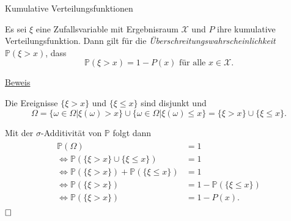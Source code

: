 \documentclass[
  8pt,
  ignorenonframetext,
]{beamer}
\begin{document}
\begin{frame}{Kumulative Verteilungsfunktionen}
\protect\hypertarget{kumulative-verteilungsfunktionen-1}{}
\small
\begin{theorem}[Überschreitungswahrscheinlichkeit]
\justifying
\normalfont
Es sei $\xi$ eine Zufallsvariable mit Ergebnisraum $\mathcal{X}$ und $P$
ihre kumulative Verteilungsfunktion. Dann gilt für die \textit{Überschreitungswahrscheinlichkeit}
$\mathbb{P}(\xi > x)$, dass
\begin{equation}
\mathbb{P}(\xi > x) = 1 - P(x) \mbox{ für alle } x \in \mathcal{X}.
\end{equation}
\end{theorem}

\footnotesize

\underline{Beweis} \vspace{1mm}

Die Ereignisse \(\{\xi > x\}\) und \(\{\xi \le x\}\) sind disjunkt und
\begin{equation}
\Omega
= \{\omega\in \Omega| \xi(\omega) > x\} \cup \{\omega\in \Omega|\xi(\omega) \le x\}
= \{\xi > x\} \cup \{\xi \le x\}.
\end{equation}

Mit der \(\sigma\)-Additivität von \(\mathbb{P}\) folgt dann
\begin{align}
\begin{split}
\mathbb{P}(\Omega) & = 1                                \\
\Leftrightarrow
\mathbb{P}( \{\xi > x\} \cup \{\xi \le x\}) & = 1           \\
\Leftrightarrow
\mathbb{P}(\{\xi > x\}) + \mathbb{P}(\{\xi \le x\}) & = 1   \\
\Leftrightarrow
\mathbb{P}(\{\xi > x\}) &  =  1 -  \mathbb{P}(\{\xi \le x\}) \\
\Leftrightarrow
\mathbb{P}(\{\xi > x\}) &  =  1 -  P(x).
\end{split}
\end{align} \(\hfill \Box\)
\end{frame}
\end{document}
